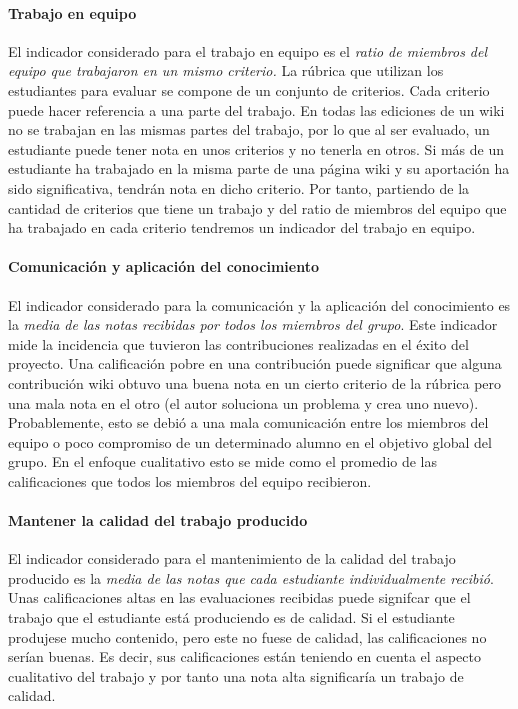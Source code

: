 \paragraph*{Trabajo en equipo}
El indicador considerado para el trabajo en equipo es el \emph{ratio de miembros del equipo que trabajaron en un mismo criterio.} La rúbrica que utilizan los estudiantes para evaluar se compone de un conjunto de criterios. Cada criterio puede hacer referencia a una parte del trabajo. En todas las ediciones de un wiki no se trabajan en las mismas partes del trabajo, por lo que al ser evaluado, un estudiante puede tener nota en unos criterios y no tenerla en otros. Si más de un estudiante ha trabajado en la misma parte de una página wiki y su aportación ha sido significativa, tendrán nota en dicho criterio. Por tanto, partiendo de la cantidad de criterios que tiene un trabajo y del ratio de miembros del equipo que ha trabajado en cada criterio tendremos un indicador del trabajo en equipo.

\paragraph*{Comunicación y aplicación del conocimiento}
El indicador considerado para la comunicación y la aplicación del conocimiento es la \emph{media de las notas recibidas por todos los miembros del grupo}. Este indicador mide la incidencia que tuvieron las contribuciones realizadas en el éxito del proyecto. Una calificación pobre en una contribución puede significar  que alguna contribución wiki obtuvo una buena nota en un cierto criterio de la rúbrica pero una mala nota en el otro (el autor soluciona un problema y crea uno nuevo). Probablemente, esto se debió a una mala comunicación entre los miembros del equipo o poco compromiso de un determinado alumno en el objetivo global del grupo. En el enfoque cualitativo esto se mide como el promedio de las calificaciones que todos los miembros del equipo recibieron. 

\paragraph*{Mantener la calidad del trabajo producido}
El indicador considerado para el mantenimiento de la calidad del trabajo producido es la \emph{media de las notas que cada estudiante individualmente recibió}. Unas calificaciones altas en las evaluaciones recibidas puede signifcar que el trabajo que el estudiante está produciendo es de calidad. Si el estudiante produjese mucho contenido, pero este no fuese de calidad, las calificaciones no serían buenas. Es decir, sus calificaciones están teniendo en cuenta el aspecto cualitativo del trabajo y por tanto una nota alta significaría un trabajo de calidad.

